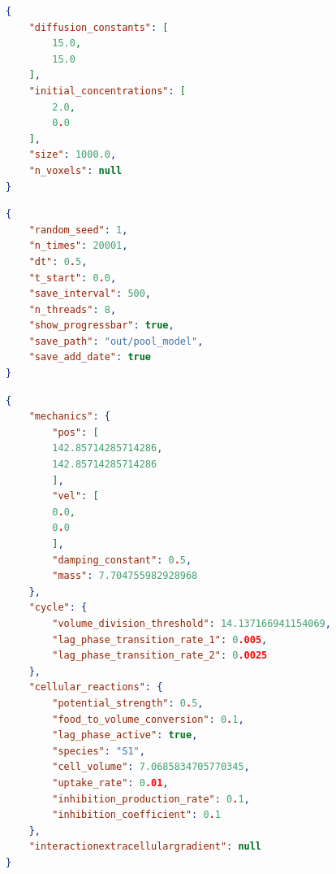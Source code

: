 \documentclass[10pt,A4paper]{article}
\numberwithin{equation}{section}
\begin{document}
\begin{listing}
\begin{lstlisting}[language=json]
{
    "diffusion_constants": [
        15.0,
        15.0
    ],
    "initial_concentrations": [
        2.0,
        0.0
    ],
    "size": 1000.0,
    "n_voxels": null
}
\end{lstlisting}
\caption{
    The \texttt{domain.json} file specifying initial values of the domain.
}
\end{listing}
%
\begin{listing}
\begin{lstlisting}[language=json]
{
    "random_seed": 1,
    "n_times": 20001,
    "dt": 0.5,
    "t_start": 0.0,
    "save_interval": 500,
    "n_threads": 8,
    "show_progressbar": true,
    "save_path": "out/pool_model",
    "save_add_date": true
}
\end{lstlisting}
\caption{
    The \texttt{meta\_params.json} file specifying all parameters not directly related to the simulation content.
    These settings do not represent any model-specific properties but rather generic ones such as time-span or number of threads.
}
\end{listing}
%
\begin{listing}
\begin{lstlisting}[language=json]
{
    "mechanics": {
        "pos": [
        142.85714285714286,
        142.85714285714286
        ],
        "vel": [
        0.0,
        0.0
        ],
        "damping_constant": 0.5,
        "mass": 7.704755982928968
    },
    "cycle": {
        "volume_division_threshold": 14.137166941154069,
        "lag_phase_transition_rate_1": 0.005,
        "lag_phase_transition_rate_2": 0.0025
    },
    "cellular_reactions": {
        "potential_strength": 0.5,
        "food_to_volume_conversion": 0.1,
        "lag_phase_active": true,
        "species": "S1",
        "cell_volume": 7.0685834705770345,
        "uptake_rate": 0.01,
        "inhibition_production_rate": 0.1,
        "inhibition_coefficient": 0.1
    },
    "interactionextracellulargradient": null
}
\end{lstlisting}
\caption{
    The first entry of the \texttt{initial\_cells.json} file which defines every individual particle present in the simulation initially.
}
\end{listing}
%
%
\end{document}
